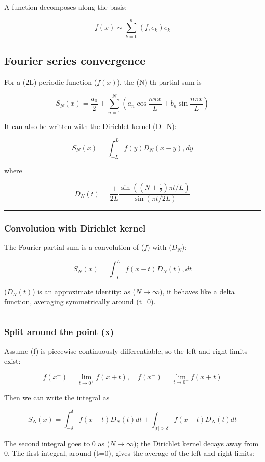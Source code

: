 A function decomposes along the basis:

\[
f(x) \sim \sum_{k=0}^{n}(f,e_k)e_k
\]

\subsection{Fourier series convergence}

For a (2L)-periodic function (\(f(x)\)), the (N)-th partial sum is

\[
S_N(x) = \frac{a_0}{2} + \sum_{n=1}^{N} \left(a_n \cos \frac{n\pi x}{L} + b_n \sin \frac{n\pi x}{L}\right)
\]

It can also be written with the Dirichlet kernel (D\_N):

\[
S_N(x) = \int_{-L}^{L} f(y) D_N(x-y) , dy
\]

where

\[
D_N(t) = \frac{1}{2L} \frac{\sin\left((N+\frac12)\pi t / L\right)}{\sin(\pi t / 2L)}
\]

\hrule

\subsubsection{Convolution with Dirichlet kernel}

The Fourier partial sum is a convolution of (\(f\)) with (\(D_N\)):

\[
S_N(x) = \int_{-L}^{L} f(x - t) D_N(t) , dt
\]

(\(D_N(t)\)) is an approximate identity: as (\(N \to \infty\)), it behaves like a delta function, averaging symmetrically around (t=0).

\hrule

\subsubsection{Split around the point (x)}

Assume (f) is piecewise continuously differentiable, so the left and right limits exist:

\[
f(x^+) = \lim_{t \to 0^+} f(x+t), \quad f(x^-) = \lim_{t \to 0^-} f(x+t)
\]

Then we can write the integral as

\[
S_N(x) = \int_{-δ}^{δ} f(x-t) D_N(t) dt + \int_{|t|>δ} f(x-t) D_N(t) dt
\]

The second integral goes to 0 as (\(N \to \infty\)); the Dirichlet kernel decays away from \(0\). The first integral, around (t=0), gives the average of the left and right limits:

